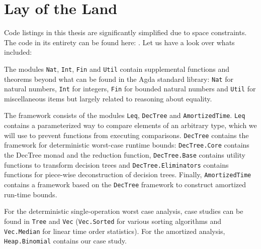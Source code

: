 
\chapter{Lay of the Land}
\label{ch:layoftheland}
Code listings in this thesis are significantly simplified due to space constraints. The code in its entirety can be found here: . Let us have a look over whats included:

The modules \texttt{Nat}, \texttt{Int}, \texttt{Fin} and \texttt{Util} contain supplemental functions and theorems beyond what can be found in the Agda standard library: \texttt{Nat} for natural numbers, \texttt{Int} for integers, \texttt{Fin} for bounded natural numbers and \texttt{Util} for miscellaneous items but largely related to reasoning about equality.

The framework consists of the modules \texttt{Leq}, \texttt{DecTree} and \texttt{AmortizedTime}. \texttt{Leq} contains a parameterized way to compare elements of an arbitrary type, which we will use to prevent functions from executing comparisons. \texttt{DecTree} contains the framework for deterministic worst-case runtime bounds: \texttt{DecTree.Core} contains the DecTree monad and the reduction function, \texttt{DecTree.Base} contains utility functions to transform decision trees and \texttt{DecTree.Eliminators} contains functions for piece-wise deconstruction of decision trees. Finally, \texttt{AmortizedTime} contains a framework based on the \texttt{DecTree} framework to construct amortized run-time bounds.

For the deterministic single-operation worst case analysis, case studies can be found in \texttt{Tree} and \texttt{Vec} (\texttt{Vec.Sorted} for various sorting algorithms and \texttt{Vec.Median} for linear time order statistics). For the amortized analysis, \texttt{Heap.Binomial} contains our case study.
